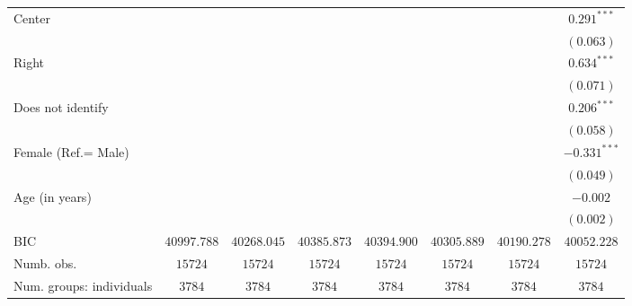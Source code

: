\documentclass[
  12pt,
]{article}
\begin{document}
\begin{table}
\begin{center}
{\begin{tabular}{l c c c c c c c}
\quad Center                                          &                &                &                &                &                &                & $0.291^{***}$  \\
                                                      &                &                &                &                &                &                & $(0.063)$      \\
\quad Right                                           &                &                &                &                &                &                & $0.634^{***}$  \\
                                                      &                &                &                &                &                &                & $(0.071)$      \\
\quad Does not identify                               &                &                &                &                &                &                & $0.206^{***}$  \\
                                                      &                &                &                &                &                &                & $(0.058)$      \\
Female (Ref.= Male)                                   &                &                &                &                &                &                & $-0.331^{***}$ \\
                                                      &                &                &                &                &                &                & $(0.049)$      \\
Age (in years)                                        &                &                &                &                &                &                & $-0.002$       \\
                                                      &                &                &                &                &                &                & $(0.002)$      \\
\hline
BIC                                                   & $40997.788$    & $40268.045$    & $40385.873$    & $40394.900$    & $40305.889$    & $40190.278$    & $40052.228$    \\
Numb. obs.                                            & $15724$        & $15724$        & $15724$        & $15724$        & $15724$        & $15724$        & $15724$        \\
Num. groups: individuals                              & $3784$         & $3784$         & $3784$         & $3784$         & $3784$         & $3784$         & $3784$         \\

\end{tabular}}
\end{center}
\end{table}
\end{document}
